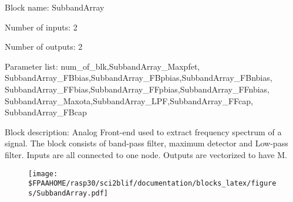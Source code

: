 \pagebreak

Block name: SubbandArray

Number of inputs: 2

Number of outputs: 2

Parameter list: num\_of\_blk,SubbandArray\_Maxpfet,\\SubbandArray\_FBbias,SubbandArray\_FBpbias,SubbandArray\_FBnbias,\\SubbandArray\_FFbias,SubbandArray\_FFpbias,SubbandArray\_FFnbias,\\SubbandArray\_Maxota,SubbandArray\_LPF,SubbandArray\_FFcap,\\SubbandArray\_FBcap

Block description: 
Analog Front-end used to extract frequency spectrum of a signal. The block consists of band-pass filter, maximum detector and Low-pass filter. 
Inputs are all connected to one node. Outputs are vectorized to have M. 

\begin{figure}[H]  %
\texttt{[image: \$FPAAHOME/rasp30/sci2blif/documentation/blocks\_latex/figures/SubbandArray.pdf]}
\end{figure}

